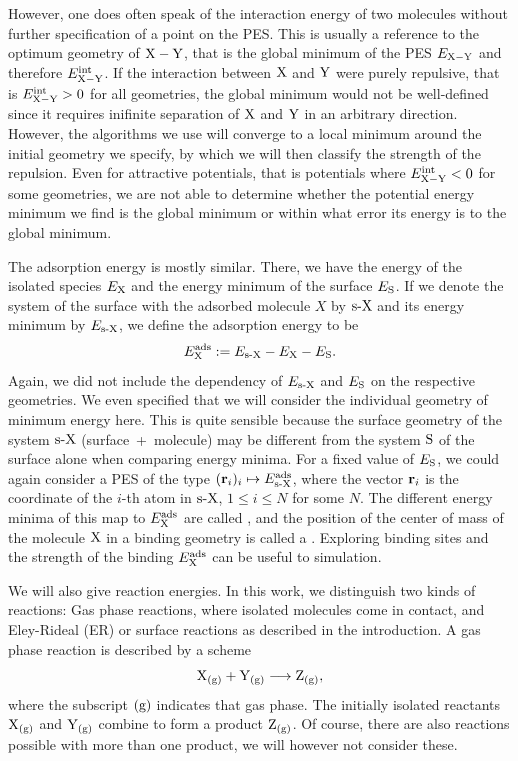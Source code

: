 \documentclass[8.5pt,twoside,twocolumn]{article}
\newcommand\eint{\enmat{E^{\te{int}}}}
\newcommand\eads{\enmat{E^{\te{ads}}}}
\newcommand\gas{\enmat{_\te{(g)}}}
\renewcommand\r{\bo r}
\theoremstyle{standard}
\begin{document}
However, one does often speak of the interaction energy of two molecules without further specification
of a point on the PES. This is usually a reference to the optimum geometry
of $\XY$, that is the global minimum of the PES $E_{\XY}$ and therefore $\eint_\XY$. If the interaction between $\X$ and $\Y$
were purely repulsive, that is $\eint_{\XY} > 0$ for all geometries, the global minimum would
not be well-defined since it requires inifinite separation of $\X$ and $\Y$ in an arbitrary direction.
However, the algorithms we use will converge to a local minimum around the initial geometry we
specify, by which we will then classify the strength of the repulsion. Even for attractive potentials,
that is potentials where $\eint_\XY < 0$ for some geometries, we are not able to determine whether 
the potential energy minimum we find is the global minimum or within what error its energy is
to the global minimum.

The adsorption energy is mostly similar. There, we have the energy of the isolated species
$E_\X$ and the energy minimum of the surface $E_{\S}$. If we denote the system of the surface 
with the adsorbed molecule $X$ by $\sX$ and its energy minimum by $E_{\sX}$, we define
the adsorption energy to be
\begin{equation}
 \eads_{\X}:= E_{\sX} - E_\X - E_\S.
 \label{Theo:AdsorptionEnergy}
\end{equation}
Again, we did not include the dependency of $E_\sX$ and $E_\S$ on the respective geometries. We
even specified that we will consider the individual geometry of minimum energy here. This is quite sensible
because the surface geometry of the system $\sX$ \mbox{(surface + molecule)} may be different from the
system $\S$ of the surface alone when comparing energy minima. For a fixed value of $E_\S$, 
we could again consider a PES of the type \mbox{$(\bo r_i)_i \mapsto \eads_\sX$}, where the
vector $\r_i$ is the coordinate of the $i$-th atom in $\sX$, $1 \le i \le N$ for some $N$. The different energy minima of 
this map to $\eads_\X$ are called , and the position of the
center of mass of the molecule $\X$ in a binding geometry is called a .
Exploring binding sites and the strength of the binding $\eads_\X$ can be useful
to simulation.

We will also give reaction energies. In this work, we distinguish two kinds of reactions:
Gas phase reactions, where isolated molecules come in contact, and Eley-Rideal (ER) \cite{EleyRideal} 
or surface reactions as described in the introduction. A gas phase reaction is described
by a scheme 
\begin{equation}
 \X\gas+\Y\gas \chemar  \Z\gas,
 \label{Theo:GasReactionScheme}
\end{equation} 
where the subscript $(\te g)$ indicates that gas phase. The initially isolated
reactants $\X\gas$ and $\Y\gas$ combine to form a product $\Z\gas$. Of course,
there are also reactions possible with more than one product, we will however not
consider these.
\end{document}
